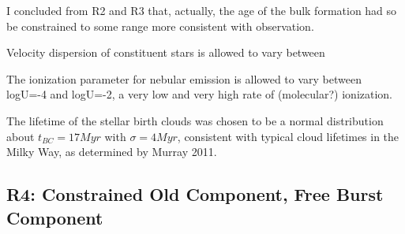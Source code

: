 \documentclass[a4paper,11pt]{article}
\begin{document}
I concluded from R2 and R3 that, actually, the age of the bulk formation had so be constrained to some range more consistent with observation.

Velocity dispersion of constituent stars is allowed to vary between

The ionization parameter for nebular emission is allowed to vary between logU=-4 and logU=-2, a very low and very high rate of (molecular?) ionization.

The lifetime of the stellar birth clouds was chosen to be a normal distribution about ${t_{BC}=17Myr}$ with ${\sigma=4Myr}$, consistent with typical cloud lifetimes in the Milky Way, as determined by Murray 2011\cite{Murray_2011}.

\subsection{R4: Constrained Old Component, Free Burst Component}\label{sec:r4}
\end{document}
